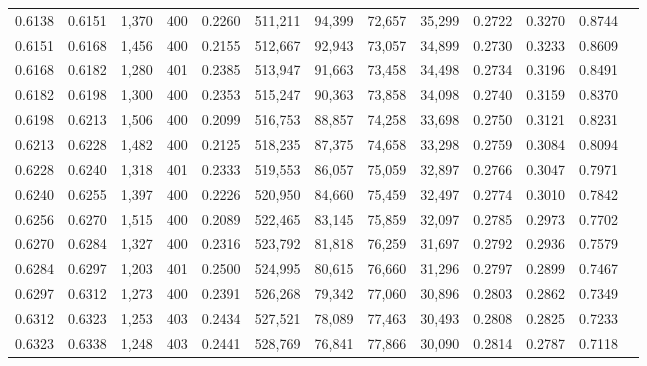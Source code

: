\begin{tabular}{rrrrrrrrrrrrr}
0.6138 & 0.6151 &  1,370 & 400 &                                     0.2260 & 511,211 &  94,399 &  72,657 &  35,299 & 0.2722 & 0.3270 & 0.8744 \\
0.6151 & 0.6168 &  1,456 & 400 &                                     0.2155 & 512,667 &  92,943 &  73,057 &  34,899 & 0.2730 & 0.3233 & 0.8609 \\
0.6168 & 0.6182 &  1,280 & 401 &                                     0.2385 & 513,947 &  91,663 &  73,458 &  34,498 & 0.2734 & 0.3196 & 0.8491 \\
0.6182 & 0.6198 &  1,300 & 400 &                                     0.2353 & 515,247 &  90,363 &  73,858 &  34,098 & 0.2740 & 0.3159 & 0.8370 \\
0.6198 & 0.6213 &  1,506 & 400 &                                     0.2099 & 516,753 &  88,857 &  74,258 &  33,698 & 0.2750 & 0.3121 & 0.8231 \\
0.6213 & 0.6228 &  1,482 & 400 &                                     0.2125 & 518,235 &  87,375 &  74,658 &  33,298 & 0.2759 & 0.3084 & 0.8094 \\
0.6228 & 0.6240 &  1,318 & 401 &                                     0.2333 & 519,553 &  86,057 &  75,059 &  32,897 & 0.2766 & 0.3047 & 0.7971 \\
0.6240 & 0.6255 &  1,397 & 400 &                                     0.2226 & 520,950 &  84,660 &  75,459 &  32,497 & 0.2774 & 0.3010 & 0.7842 \\
0.6256 & 0.6270 &  1,515 & 400 &                                     0.2089 & 522,465 &  83,145 &  75,859 &  32,097 & 0.2785 & 0.2973 & 0.7702 \\
0.6270 & 0.6284 &  1,327 & 400 &                                     0.2316 & 523,792 &  81,818 &  76,259 &  31,697 & 0.2792 & 0.2936 & 0.7579 \\
0.6284 & 0.6297 &  1,203 & 401 &                                     0.2500 & 524,995 &  80,615 &  76,660 &  31,296 & 0.2797 & 0.2899 & 0.7467 \\
0.6297 & 0.6312 &  1,273 & 400 &                                     0.2391 & 526,268 &  79,342 &  77,060 &  30,896 & 0.2803 & 0.2862 & 0.7349 \\
0.6312 & 0.6323 &  1,253 & 403 &                                     0.2434 & 527,521 &  78,089 &  77,463 &  30,493 & 0.2808 & 0.2825 & 0.7233 \\
0.6323 & 0.6338 &  1,248 & 403 &                                     0.2441 & 528,769 &  76,841 &  77,866 &  30,090 & 0.2814 & 0.2787 & 0.7118 \\

\end{tabular}
